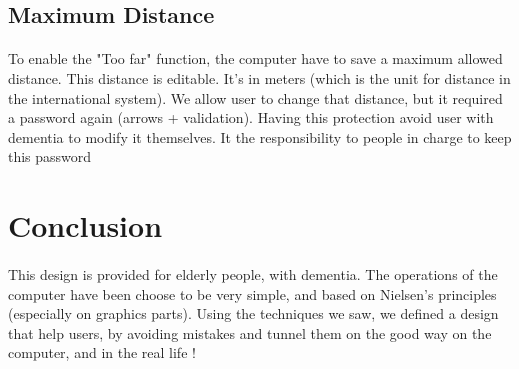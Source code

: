 \documentclass[a4paper,11pt]{article} %
\begin{document}
\subsection{Maximum Distance}
\paragraph{}To enable the "Too far" function, the computer have to save a maximum allowed distance. This distance is editable. It's in meters (which is the unit for distance in the international system). We allow user to change that distance, but it required a password again (arrows + validation). Having this protection avoid user with dementia to modify it themselves. It the responsibility to people in charge to keep this password
\section*{Conclusion}
\paragraph{}This design is provided for elderly people, with dementia. The operations of the computer have been choose to be very simple, and based on Nielsen's principles (especially on graphics parts). Using the techniques we saw, we defined a design that help users, by avoiding mistakes and tunnel them on the good way on the computer, and in the real life !

%
%
\end{document}
